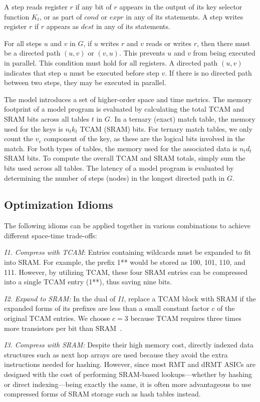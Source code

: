 A step reads register $r$ if any bit of $r$ appears in the output of its key selector function $K_t$, or as part of $cond$ or $expr$ in any of its statements. A step writes register $r$ if $r$ appears as $dest$ in any of its statements.

For all steps $u$ and $v$ in $G$, if $u$ writes $r$ and $v$ reads or writes $r$, then there must be a directed path $(u, v)$ or $(v, u)$. This prevents $u$ and $v$ from being executed in parallel. This condition must hold for all registers. A directed path $(u, v)$ indicates that step $u$ must be executed before step $v$. If there is no directed path between two steps, they may be executed in parallel.

The \cram model introduces a set of higher-order space and time metrics. The memory footprint of a \cram model program is evaluated by calculating the total TCAM and SRAM bits across all tables $t$ in $G$. In a ternary (exact) match table, the memory used for the keys is $n_t k_t$ TCAM (SRAM) bits. For ternary match tables, we only count the $v_e$ component of the key, as these are the logical bits involved in the match. For both types of tables, the memory used for the associated data is $n_t d_t$ SRAM bits. To compute the overall TCAM and SRAM totals, simply sum the bits used across all tables. The latency of a \cram model program is evaluated by determining the number of steps (nodes) in the longest directed path in $G$.

\subsection{Optimization Idioms}\label{subsec:optimization_idioms}

The following idioms can be applied together in various combinations to achieve different space-time trade-offs:

{\em I1. Compress with TCAM}: Entries containing wildcards must be expanded to fit into SRAM. For example, the prefix 1** would be stored as 100, 101, 110, and 111. However, by utilizing TCAM, these four SRAM entries can be compressed into a single TCAM entry (1**), thus saving nine bits.

{\em I2. Expand to SRAM:} In the dual of {\em I1}, replace a TCAM block with SRAM if the expanded forms of its prefixes are less than a small constant factor $c$ of the original TCAM entries. We choose $c=3$ because TCAM requires three times more transistors per bit than SRAM~\cite{transistors}.

{\em I3. Compress with SRAM:} Despite their high memory cost, directly indexed data structures such as next hop arrays are used because they avoid the extra instructions needed for hashing. However, since most RMT and dRMT ASICs are designed with the cost of performing SRAM-based lookups---whether by hashing or direct indexing---being exactly the same, it is often more advantageous to use compressed forms of SRAM storage such as hash tables instead.

